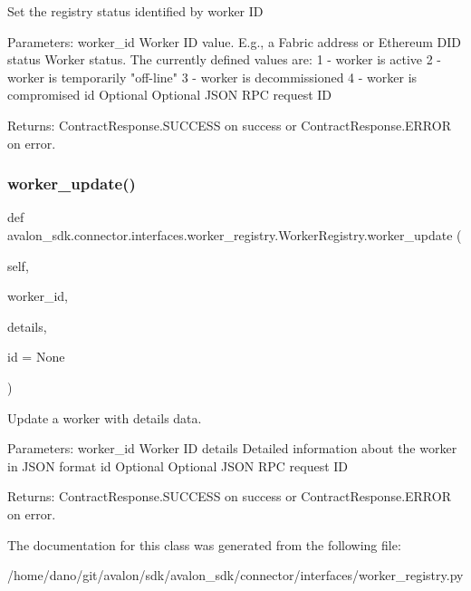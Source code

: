 \begin{DoxyVerb}Set the registry status identified by worker ID

Parameters:
worker_id Worker ID value. E.g., a Fabric address
  or Ethereum DID
status    Worker status. The currently defined values are:
  1 - worker is active
  2 - worker is temporarily "off-line"
  3 - worker is decommissioned
  4 - worker is compromised
id        Optional Optional JSON RPC request ID

Returns:
ContractResponse.SUCCESS on success
or ContractResponse.ERROR on error.
\end{DoxyVerb}
 \mbox{\label{classavalon__sdk_1_1connector_1_1interfaces_1_1worker__registry_1_1WorkerRegistry_af19b8ace10ce24494c6525a594fdbc57}} 
\subsubsection{\texorpdfstring{worker\+\_\+update()}{worker\_update()}}
{\footnotesize\ttfamily def avalon\+\_\+sdk.\+connector.\+interfaces.\+worker\+\_\+registry.\+Worker\+Registry.\+worker\+\_\+update (\begin{DoxyParamCaption}\item[{}]{self,  }\item[{}]{worker\+\_\+id,  }\item[{}]{details,  }\item[{}]{id = {\ttfamily None} }\end{DoxyParamCaption})}

\begin{DoxyVerb}Update a worker with details data.

Parameters:
worker_id  Worker ID
details    Detailed information about the worker in JSON format
id         Optional Optional JSON RPC request ID

Returns:
ContractResponse.SUCCESS on success
or ContractResponse.ERROR on error.
\end{DoxyVerb}
 

The documentation for this class was generated from the following file\+:\begin{DoxyCompactItemize}
\item 
/home/dano/git/avalon/sdk/avalon\+\_\+sdk/connector/interfaces/worker\+\_\+registry.\+py\end{DoxyCompactItemize}
